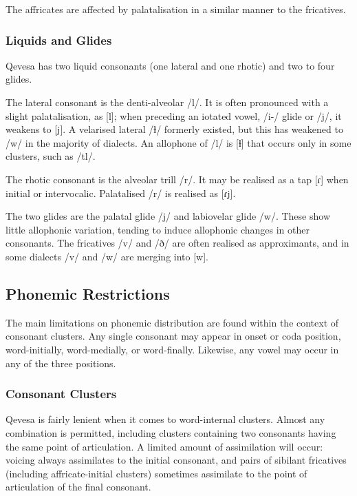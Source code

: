 \documentclass[grammar]{subfiles}
\begin{document}
  The affricates are affected by palatalisation in a similar manner to the fricatives.

  \subsubsection{Liquids and Glides}
  \label{sssec:liquids}

  Qevesa has two liquid consonants (one lateral and one rhotic) and two to four glides.

  The lateral consonant is the denti-alveolar /l/. It is often pronounced with a slight palatalisation, as [l\superj]; when preceding an iotated vowel, /i-/ glide or /j/, it weakens to [j]. A velarised lateral /ɫ/ formerly existed, but this has weakened to /w/ in the majority of dialects. An allophone of /l/ is [ɬ] that occurs only in some clusters, such as /tl/.

  The rhotic consonant is the alveolar trill /r/. It may be realised as a tap [ɾ] when initial or intervocalic. Palatalised /r/ is realised as [ɾj].

  The two glides are the palatal glide /j/ and labiovelar glide /w/. These show little allophonic variation, tending to induce allophonic changes in other consonants. The fricatives /v/ and /ð/ are often realised as approximants, and in some dialects /v/ and /w/ are merging into [w].

  \subsection{Phonemic Restrictions}
  \label{ssec:phonemic_restrictions}

  The main limitations on phonemic distribution are found within the context of consonant clusters. Any single consonant may appear in onset or coda position, word-initially, word-medially, or word-finally. Likewise, any vowel may occur in any of the three positions. 

  \subsubsection{Consonant Clusters}
  \label{sssec:consonant_clusters}

  Qevesa is fairly lenient when it comes to word-internal clusters. 
  Almost any combination is permitted, including clusters containing two consonants having the same point of articulation. 
  A limited amount of assimilation will occur: voicing always assimilates to the initial consonant, and pairs of sibilant fricatives (including affricate-initial clusters) sometimes assimilate to the point of articulation of the final consonant. %
\end{document}
